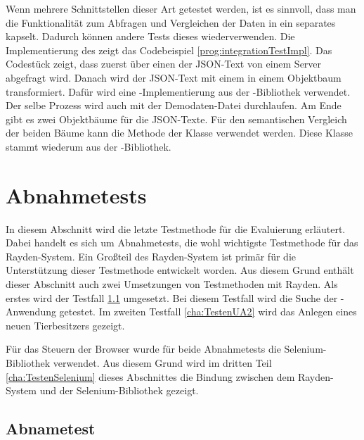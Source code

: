 \SuperPar
Wenn mehrere Schnittstellen dieser Art getestet werden, ist es sinnvoll, dass man die Funktionalität zum Abfragen und Vergleichen der Daten in ein separates  kapselt. Dadurch können andere Tests dieses  wiederverwenden. Die Implementierung des  zeigt das Codebeispiel \ref{prog:integrationTestImpl}. Das Codestück zeigt, dass zuerst über einen  der JSON-Text von einem Server abgefragt wird. Danach wird der JSON-Text mit einem  in einem Objektbaum transformiert. Dafür wird eine -Implementierung aus der -Bibliothek verwendet. Der selbe Prozess wird auch mit der Demodaten-Datei durchlaufen. Am Ende gibt es zwei Objektbäume für die JSON-Texte. Für den semantischen Vergleich der beiden Bäume kann die Methode  der Klasse  verwendet werden. Diese Klasse stammt wiederum aus der -Bibliothek.

\section{Abnahmetests}
\label{cha:TestenUA}

In diesem Abschnitt wird die letzte Testmethode für die Evaluierung erläutert. Dabei handelt es sich um Abnahmetests, die wohl wichtigste Testmethode für das Rayden-System. Ein Großteil des Rayden-System ist primär für die Unterstützung dieser Testmethode entwickelt worden. Aus diesem Grund enthält dieser Abschnitt auch zwei Umsetzungen von Testmethoden mit Rayden. Als erstes wird der Testfall  \ref{cha:TestenUA1} umgesetzt. Bei diesem Testfall wird die Suche der -Anwendung getestet. Im zweiten Testfall \ref{cha:TestenUA2} wird das Anlegen eines neuen Tierbesitzers gezeigt. 

\SuperPar
Für das Steuern der Browser wurde für beide Abnahmetests die Selenium-Bibliothek verwendet. Aus diesem Grund wird im dritten Teil \ref{cha:TestenSelenium} dieses Abschnittes die Bindung zwischen dem Rayden-System und der Selenium-Bibliothek gezeigt. 


\subsection{Abnametest }
\label{cha:TestenUA1}

